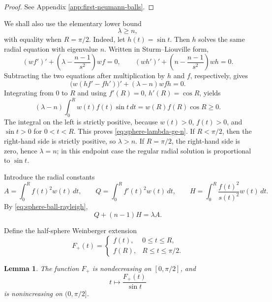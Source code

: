\documentclass[11pt]{amsart}
\newtheorem{lemma}[theorem]{Lemma}
\theoremstyle{remark}
\begin{document}
\begin{proof}
See Appendix \ref{app:first-neumann-balls}.
\end{proof}

We shall also use the elementary lower bound
\begin{equation}\label{eq:sphere-lambda-ge-n}
        \lambda\ge n,
\end{equation}
with equality when $R=\pi/2$.  Indeed, let $h(t)=\sin t$.  Then $h$ solves the same radial equation with eigenvalue $n$.  Written in Sturm--Liouville form,
$$
        (wf')'+\left(\lambda-\frac{n-1}{s^2}\right)wf=0,
        \qquad
        (wh')'+\left(n-\frac{n-1}{s^2}\right)wh=0.
$$
Subtracting the two equations after multiplication by $h$ and $f$, respectively, gives
$$
        \bigl(w(hf'-fh')\bigr)'+(\lambda-n)wfh=0.
$$
Integrating from $0$ to $R$ and using $f'(R)=0$, $h'(R)=\cos R$, yields
$$
        (\lambda-n)\int_0^R w(t)f(t)\sin t\,dt
        =w(R)f(R)\cos R\ge0.
$$
The integral on the left is strictly positive, because $w(t)>0$, $f(t)>0$, and $\sin t>0$ for $0<t<R$.  This proves \eqref{eq:sphere-lambda-ge-n}.  If $R<\pi/2$, then the right-hand side is strictly positive, so $\lambda>n$.  If $R=\pi/2$, the right-hand side is zero, hence $\lambda=n$; in this endpoint case the regular radial solution is proportional to $\sin t$.

Introduce the radial constants
\begin{equation}\label{eq:sphere-AQH-def}
        A=\int_0^R f(t)^2w(t)\,dt,
        \qquad
        Q=\int_0^R f'(t)^2w(t)\,dt,
        \qquad
        H=\int_0^R \frac{f(t)^2}{s(t)^2}w(t)\,dt.
\end{equation}
By \eqref{eq:sphere-ball-rayleigh},
\begin{equation}\label{eq:sphere-eigen-identity}
        Q+(n-1)H=\lambda A.
\end{equation}

Define the half-sphere Weinberger extension
\begin{equation}\label{eq:sphere-F-plus-def}
        F_+(t)=
        \begin{cases}
        f(t),&0\le t\le R,\\
        f(R),&R\le t\le \pi/2.
        \end{cases}
\end{equation}

\begin{lemma}\label{lem:sphere-F-plus-over-sin}
The function $F_+$ is nondecreasing on $[0,\pi/2]$, and
$$
        t\longmapsto \frac{F_+(t)}{\sin t}
$$
is nonincreasing on $(0,\pi/2]$.
\end{lemma}
\end{document}

